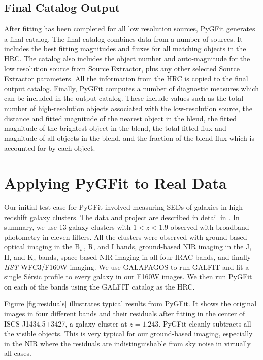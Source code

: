 \documentclass[preprint]{aastex}
\newcommand{\sersic}{S\'{e}rsic}
\newcommand{\galfit}{GALFIT}
\newcommand{\pygfit}{PyGFit}
\newcommand{\extractor}{Source Extractor}
\newcommand{\galapagos}{GALAPAGOS}
\begin{document}
\subsection{Final Catalog Output}\label{sec:catalog}

After fitting has been completed for all low resolution sources, \pygfit{} generates a final catalog.  The final catalog combines data from a number of sources.  It includes the best fitting magnitudes and fluxes for all matching objects in the HRC. The catalog also includes the object number and auto-magnitude for the low resolution source from \extractor{}, plus any other selected \extractor{} parameters.  All the information from the HRC is copied to the final output catalog.  Finally, \pygfit{} computes a number of diagnostic measures which can be included in the output catalog.  These include values such as the total number of high-resolution objects associated with the low-resolution source, the distance and fitted magnitude of the nearest object in the blend, the fitted magnitude of the brightest object in the blend, the total fitted flux and magnitude of all objects in the blend, and the fraction of the blend flux which is accounted for by each object.

\section{Applying PyGFit to Real Data}\label{sec:example}

Our initial test case for \pygfit{} involved measuring SEDs of galaxies in high redshift galaxy clusters.  The data and project are described in detail in \citet{mancone13}.  In summary, we use 13 galaxy clusters with $1 < z < 1.9$ observed with broadband photometry in eleven filters.  All the clusters were observed with ground-based optical imaging in the B$_w$, R, and I bands, ground-based NIR imaging in the J, H, and K$_s$ bands, space-based NIR imaging in all four IRAC bands, and finally {\itshape HST} WFC3/F160W imaging.  We use \galapagos{} \citep{galapagos} to run \galfit{} and fit a single \sersic{} profile to every galaxy in our F160W images.  We then run \pygfit{} on each of the bands using the \galfit{} catalog as the HRC.

Figure \ref{fig:residuals} illustrates typical results from \pygfit{}.  It shows the original images in four different bands and their residuals after fitting in the center of ISCS J1434.5+3427, a galaxy cluster at $z=1.243$.  \pygfit{} cleanly subtracts all the visible objects.  This is very typical for our ground-based imaging, especially in the NIR where the residuals are indistinguishable from sky noise in virtually all cases.
\end{document}
